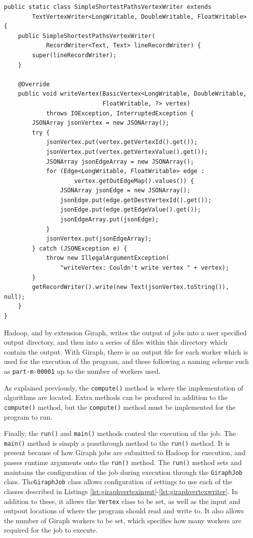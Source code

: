 \begin{lstlisting}[float]
public static class SimpleShortestPathsVertexWriter extends
        TextVertexWriter<LongWritable, DoubleWritable, FloatWritable> {
    public SimpleShortestPathsVertexWriter(
            RecordWriter<Text, Text> lineRecordWriter) {
        super(lineRecordWriter);
    }

    @Override
    public void writeVertex(BasicVertex<LongWritable, DoubleWritable,
                            FloatWritable, ?> vertex)
            throws IOException, InterruptedException {
        JSONArray jsonVertex = new JSONArray();
        try {
            jsonVertex.put(vertex.getVertexId().get());
            jsonVertex.put(vertex.getVertexValue().get());
            JSONArray jsonEdgeArray = new JSONArray();
            for (Edge<LongWritable, FloatWritable> edge :
                    vertex.getOutEdgeMap().values()) {
                JSONArray jsonEdge = new JSONArray();
                jsonEdge.put(edge.getDestVertexId().get());
                jsonEdge.put(edge.getEdgeValue().get());
                jsonEdgeArray.put(jsonEdge);
            }
            jsonVertex.put(jsonEdgeArray);
        } catch (JSONException e) {
            throw new IllegalArgumentException(
                "writeVertex: Couldn't write vertex " + vertex);
        }
        getRecordWriter().write(new Text(jsonVertex.toString()), null);
    }
}
\end{lstlisting}

Hadoop, and by extension Giraph, writes the output of jobs into a user
specified output directory, and then into a series of files within this
directory which contain the output. With Giraph, there is an output file for
each worker which is used for the execution of the program, and these following
a naming scheme such as {\tt part-m-00001} up to the number of workers used.

As explained previously, the \verb/compute()/ method is where the
implementation of algorithms are located. Extra methods can be produced in
addition to the \verb/compute()/ method, but the \verb/compute()/ method must
be implemented for the program to run.

Finally, the \verb/run()/ and \verb/main()/ methods control the execution of
the job. The \verb/main()/ method is simply a passthrough method to the
\verb/run()/ method. It is present because of how Giraph jobs are submitted to
Hadoop for execution, and passes runtime arguments onto the \verb/run()/
method. The \verb/run()/ method sets and maintains the configuration of the job
during execution through the \verb/GiraphJob/ class. The\verb/GiraphJob/ class
allows configuration of settings to use each of the classes described in
Listings \ref{lst:giraphvertexinput}-\ref{lst:giraphvertexwriter}. In addition
to these, it allows the \verb/Vertex/ class to be set, as well as the input and
outpout locations of where the program should read and write to. It also allows
the number of Giraph workers to be set, which specifies how many workers are
required for the job to execute.


